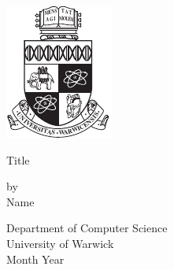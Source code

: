 \thispagestyle{empty}

\begin{spacing}{2}
	\begin{center}
		\includegraphics[scale = 1.9]{Preamble/WarwickCrest.pdf}
	\end{center}
	\begin{center}
		Title
		\vspace{5mm}
	\end{center}
	\begin{center}
		by
		\\Name
		\vspace{20mm}
	\end{center}
	\begin{center}
		Department of Computer Science
		\\ University of Warwick
		\\ Month \space Year
	\end{center}
\end{spacing}



